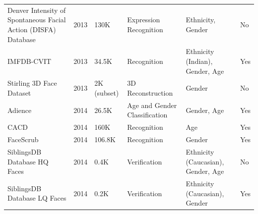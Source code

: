 \documentclass[journal]{IEEEtran}
\begin{document}
\begin{table}[!t]
\begin{tabular}{|p{}|C{0.025\textwidth}|C{0.09\textwidth}|p{0.19\textwidth}|p{0.2\textwidth}|C{0.06\textwidth}|}
Denver Intensity of Spontaneous Facial Action (DISFA) Database \cite{mavadati2013disfa} & 2013          & 130K                        & Expression Recognition                                                         & Ethnicity, Gender                                   & No                     \\
IMFDB-CVIT \cite{setty2013indian}                                                       & 2013          & 34.5K                       & Recognition                                                                    & Ethnicity (Indian), Gender, Age                     & Yes                    \\
Stirling 3D Face Dataset \cite{stirlingdb}                                              & 2013          & 2K (subset)                 & 3D Reconstruction                                                              & Gender                                              & No                     \\
Adience \cite{eidinger2014age}                                                          & 2014          & 26.5K                       & Age and Gender Classification                                                  & Gender, Age                                         & Yes                    \\
CACD \cite{chen2014cross}                                                               & 2014          & 160K                        & Recognition                                                                    & Age                                                 & Yes                    \\
FaceScrub \cite{ng2014data}                                                             & 2014          & 106.8K                      & Recognition                                                                    & Gender                                              & Yes                    \\
SiblingsDB Database HQ Faces \cite{vieira2014detecting}                                 & 2014          & 0.4K                        & Verification                                                                   & Ethnicity (Caucasian), Gender, Age                  & No                     \\
SiblingsDB Database LQ Faces \cite{vieira2014detecting}                                 & 2014          & 0.2K                        & Verification                                                                   & Ethnicity (Caucasian), Gender                       & Yes                    \\

\end{tabular}
\end{table}
\end{document}
